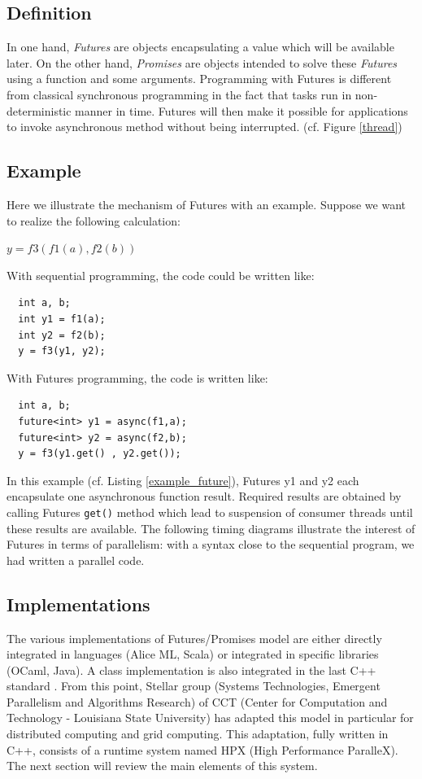\documentclass[smallextended]{svjour3}
\begin{document}
\subsection{Definition}
In one hand, \emph{Futures} are objects encapsulating a value which will be available later. On the other hand, \emph{Promises} are objects intended to solve these \emph{Futures} using a function and some arguments. Programming with Futures is different from classical synchronous programming in the fact that tasks run in non-deterministic manner in time. Futures will then make it possible for applications to invoke asynchronous method without being interrupted. (cf. Figure \ref{thread})

\subsection{Example}
Here we illustrate the mechanism of Futures with an example. Suppose we want to
realize the following calculation:   
\begin{center}
  $y = f3(f1(a),f2(b))$
\end{center}

With sequential programming, the code could be written like:
\begin{lstlisting}
  int a, b;
  int y1 = f1(a);
  int y2 = f2(b);
  y = f3(y1, y2);
\end{lstlisting}

With Futures programming, the code is written like:
\begin{lstlisting}
  int a, b;
  future<int> y1 = async(f1,a);
  future<int> y2 = async(f2,b);
  y = f3(y1.get() , y2.get());
\end{lstlisting}


In this example (cf. Listing \ref{example_future}), Futures y1 and y2 each encapsulate one asynchronous function result. Required results are obtained by calling Futures \texttt{get()} method which lead to suspension of consumer threads until these results are available. The following timing diagrams illustrate the interest of Futures in terms of parallelism: with a syntax close to the sequential program, we had written a parallel code.

\subsection{Implementations}
The various implementations of Futures/Promises model are either directly integrated in languages (Alice ML, Scala) or integrated in specific libraries (OCaml, Java). A class implementation is also integrated in the last C++ standard \cite{Futuresc++}. From this point, Stellar group (Systems Technologies, Emergent Parallelism and Algorithms Research) of CCT (Center for Computation and Technology - Louisiana State University) has adapted this model in particular for distributed computing and grid computing. This adaptation, fully written in C++, consists of a runtime system named HPX (High Performance ParalleX). The next section will review the main elements of this system.   
\end{document}
